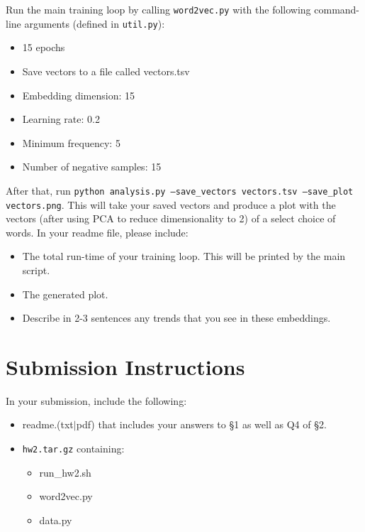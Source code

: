 \documentclass[11pt]{article}
\begin{document}
\vspace{2em}
 Run the main training loop by calling \texttt{word2vec.py} with the following command-line arguments (defined in \texttt{util.py}):
\begin{itemize}
  \item 15 epochs
  \item Save vectors to a file called vectors.tsv
  \item Embedding dimension: 15
  \item Learning rate: 0.2
  \item Minimum frequency: 5
  \item Number of negative samples: 15
\end{itemize}
After that, run \texttt{python analysis.py --save\_vectors vectors.tsv --save\_plot vectors.png}.  This will take your saved vectors and produce a plot with the vectors (after using PCA to reduce dimensionality to 2) of a select choice of words.  In your readme file, please include: 
\begin{itemize}
  \item The total run-time of your training loop.  This will be printed by the main script.
  \item The generated plot.
  \item Describe in 2-3 sentences any trends that you see in these embeddings.
\end{itemize}


\section*{Submission Instructions}

In your submission, include the following:
\begin{itemize}
  \item readme.(txt$\mid$pdf) that includes your answers to \S1 as well as Q4 of \S2. 
  \item \texttt{hw2.tar.gz} containing:
  \begin{itemize}
    \item run\_hw2.sh
    \item word2vec.py
    \item data.py
  \end{itemize}
\end{itemize}
\end{document}
